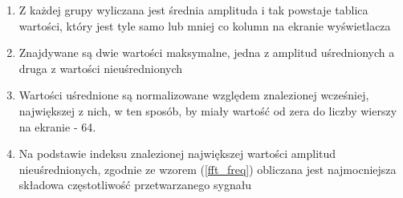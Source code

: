 \begin{enumerate}
    \item Z każdej grupy wyliczana jest średnia amplituda i tak powstaje tablica wartości, który jest tyle samo lub mniej co kolumn na ekranie wyświetlacza
    \item Znajdywane są dwie wartości maksymalne, jedna z amplitud uśrednionych a druga z wartości nieuśrednionych
    \item Wartości uśrednione są normalizowane względem znalezionej wcześniej, największej z nich, w ten sposób, by miały wartość od zera do liczby wierszy na ekranie - 64.
    \item Na podstawie indeksu znalezionej największej wartości amplitud nieuśrednionych, zgodnie ze wzorem (\ref{fft_freq}) obliczana jest najmocniejsza składowa częstotliwość przetwarzanego sygnału
\end{enumerate}
